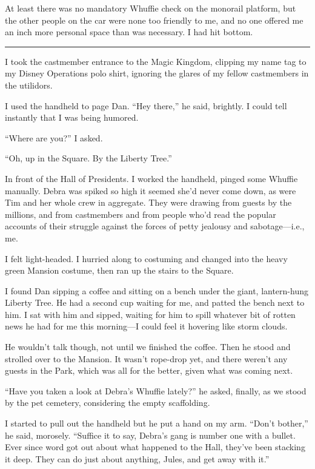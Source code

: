 At least there was no mandatory Whuffie check on the monorail
platform, but the other people on the car were none too friendly to
me, and no one offered me an inch more personal space than was
necessary. I had hit bottom.

\begin{center}\rule{3in}{0.4pt}\end{center}

I took the castmember entrance to the Magic Kingdom, clipping my
name tag to my Disney Operations polo shirt, ignoring the glares of
my fellow castmembers in the utilidors.

I used the handheld to page Dan. “Hey there,” he said, brightly. I
could tell instantly that I was being humored.

“Where are you?” I asked.

“Oh, up in the Square. By the Liberty Tree.”

In front of the Hall of Presidents. I worked the handheld, pinged
some Whuffie manually. Debra was spiked so high it seemed she'd
never come down, as were Tim and her whole crew in aggregate. They
were drawing from guests by the millions, and from castmembers and
from people who'd read the popular accounts of their struggle
against the forces of petty jealousy and sabotage—i.e., me.

I felt light-headed. I hurried along to costuming and changed into
the heavy green Mansion costume, then ran up the stairs to the
Square.

I found Dan sipping a coffee and sitting on a bench under the
giant, lantern-hung Liberty Tree. He had a second cup waiting for
me, and patted the bench next to him. I sat with him and sipped,
waiting for him to spill whatever bit of rotten news he had for me
this morning—I could feel it hovering like storm clouds.

He wouldn't talk though, not until we finished the coffee. Then he
stood and strolled over to the Mansion. It wasn't rope-drop yet,
and there weren't any guests in the Park, which was all for the
better, given what was coming next.

“Have you taken a look at Debra's Whuffie lately?” he asked,
finally, as we stood by the pet cemetery, considering the empty
scaffolding.

I started to pull out the handheld but he put a hand on my arm.
“Don't bother,” he said, morosely. “Suffice it to say, Debra's gang
is number one with a bullet. Ever since word got out about what
happened to the Hall, they've been stacking it deep. They can do
just about anything, Jules, and get away with it.”

